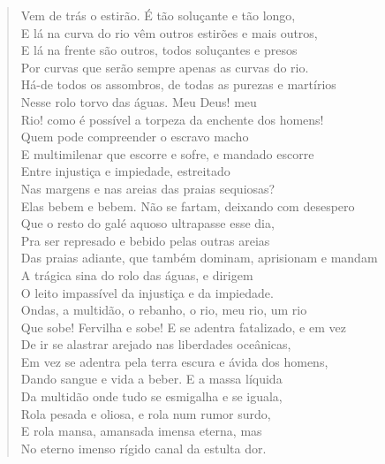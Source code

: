\begin{verse}
Vem de trás o estirão. É tão soluçante e tão longo,\\
E lá na curva do rio vêm outros estirões e mais outros,\\
E lá na frente são outros, todos soluçantes e presos\\
Por curvas que serão sempre apenas as curvas do rio.\\
Há-de todos os assombros, de todas as purezas e martírios\\
Nesse rolo torvo das águas. Meu Deus! meu\\
Rio! como é possível a torpeza da enchente dos homens!\\
Quem pode compreender o escravo macho\\
E multimilenar que escorre e sofre, e mandado escorre\\
Entre injustiça e impiedade, estreitado\\
Nas margens e nas areias das praias sequiosas?\\
Elas bebem e bebem. Não se fartam, deixando com desespero\\
Que o resto do galé aquoso ultrapasse esse dia,\\
Pra ser represado e bebido pelas outras areias\\
Das praias adiante, que também dominam, aprisionam e mandam\\
A trágica sina do rolo das águas, e dirigem\\
O leito impassível da injustiça e da impiedade.\\
Ondas, a multidão, o rebanho, o rio, meu rio, um rio\\
Que sobe! Fervilha e sobe! E se adentra fatalizado, e em vez\\
De ir se alastrar arejado nas liberdades oceânicas,\\
Em vez se adentra pela terra escura e ávida dos homens,\\
Dando sangue e vida a beber. E a massa líquida\\
Da multidão onde tudo se esmigalha e se iguala,\\
Rola pesada e oliosa, e rola num rumor surdo,\\
E rola mansa, amansada imensa eterna, mas\\
No eterno imenso rígido canal da estulta dor.


\end{verse}

